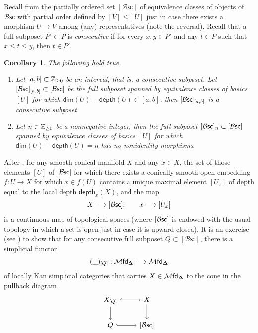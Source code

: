 \documentclass[10pt, reqno, twoside
, final
]{amsart}
\numberwithin{equation}{subsection}%
\theoremstyle{definition}
\theoremstyle{definition}
\theoremstyle{definition}
\theoremstyle{definition}
\theoremstyle{definition}
\theoremstyle{definition}
\theoremstyle{definition}
\theoremstyle{definition}
\theoremstyle{definition}
\theoremstyle{plain}
\theoremstyle{definition}
\theoremstyle{plain}
\theoremstyle{definition}
\theoremstyle{plain}
\newtheorem{cor}[defn]{Corollary}
\theoremstyle{definition}
\theoremstyle{definition}
\theoremstyle{plain}
\theoremstyle{plain}
\theoremstyle{definition}
\theoremstyle{plain}
\theoremstyle{plain}
\theoremstyle{plain}
\begin{document}
Recall from \cite[Section 4.3]{AFT-local-structures} the partially ordered set $[\mathcal{B}\mathsf{sc}]$ of equivalence classes of objects of $\mathcal{B}\mathsf{sc}$ with partial order defined by $[V]\leq [U]$ just in case there exists a morphism $U\rightarrow V$ among (any) representatives (note the reversal). Recall that a full subposet $P'\subset P$ is {\em consecutive} if for every $x,y \in P'$ and any $t\in P$ such that $x\leq t\leq y$, then $t\in P'$.
\begin{cor}\label{cor:basicsposet}
The following hold true.
\begin{enumerate}[$(1)$]
    \item Let $[a,b]\subset \mathbb{Z}_{\geq0}$ be an interval, that is, a consecutive subposet. Let $[\mathcal{B}\mathsf{sc}]_{[a,b]}\subset [\mathcal{B}\mathsf{sc}]$ be the full subposet spanned by equivalence classes of basics $[U]$ for which $\mathsf{dim}(U)-\mathsf{depth}(U) \in [a,b]$, then $[\mathcal{B}\mathsf{sc}]_{[a,b]}$ is a consecutive subposet. 
    \item Let $n\in \mathbb{Z}_{\geq 0}$ be a nonnegative integer, then the full subposet $[\mathcal{B}\mathsf{sc}]_{n}\subset [\mathcal{B}\mathsf{sc}]$ spanned by equivalence classes of basics $[U]$ for which $\mathsf{dim}(U)-\mathsf{depth}(U) =n$ has no nonidentity morphisms. 
\end{enumerate}
\end{cor}
 After \cite[Lemma 4.4.4]{AFT-local-structures}, for any smooth conical manifold $X$ and any $x\in X$, the set of those elements $[U]$ of $[\mathcal{B}\mathsf{sc}]$ for which there exists a conically smooth open embedding $f:U\rightarrow X$ for which $x\in f(U)$ contains a unique maximal element $[U_x]$ of depth equal to the local depth $\mathsf{depth}_x(X)$, and the map
 \[ X\longrightarrow   [\mathcal{B}\mathsf{sc}],\quad\quad x\longmapsto [U_x] \]
is a continuous map of topological spaces (where $[\mathcal{B}\mathsf{sc}]$ is endowed with the usual topology in which a set is open just in case it is upward closed). It is an exercise (see \cite[Proposition 4.4.7]{AFT-local-structures}) to show that for any consecutive full subposet $Q\subset [\mathcal{B}\mathsf{sc}]$, there is a simplicial functor 
\begin{equation}\label{eq:stratumfunctor}
  (\_)_{[Q]}:  \mathcal{M}\mathsf{fd}_{\boldsymbol{\Delta}} \longrightarrow  \mathcal{M}\mathsf{fd}_{\boldsymbol{\Delta}} 
\end{equation}
of locally Kan simplicial categories that carries $X \in  \mathcal{M}\mathsf{fd}_{\boldsymbol{\Delta}}$ to the cone in the pullback diagram 
\[
\begin{tikzcd}
 X_{[Q]} \ar[d] \ar[r,hook]& X \ar[d] \\
 Q \ar[r,hook] & {[}\mathcal{B}\mathsf{sc}{]}
\end{tikzcd}
\]
\end{document}
